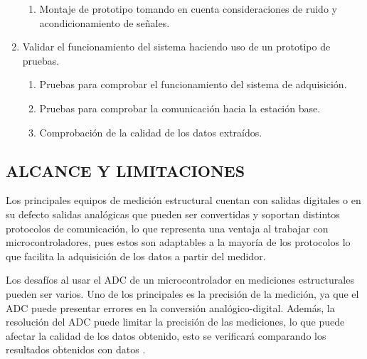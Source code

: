 \documentclass[12pt,letterpaper]{article}
\begin{document}
\begin{enumerate}[1.]
\begin{enumerate}
		      \item Montaje de prototipo tomando en cuenta consideraciones de ruido y acondicionamiento de señales.

	      \end{enumerate}

	\item Validar el funcionamiento del sistema haciendo uso de un prototipo de pruebas.


	      \begin{enumerate}

		      \item Pruebas para comprobar el funcionamiento del sistema de adquisición.
		      \item Pruebas para comprobar la comunicación hacia la estación base.
		      \item Comprobación de la calidad de los datos extraídos.

	      \end{enumerate}





\end{enumerate}




\newpage


\begin{center}

	\section*{ ALCANCE Y LIMITACIONES}
\end{center}

Los principales equipos de medición estructural cuentan con salidas digitales o en su defecto salidas analógicas que pueden ser convertidas y soportan distintos protocolos de comunicación, lo que representa una ventaja al trabajar con microcontroladores, pues estos son adaptables a la mayoría de los protocolos lo que facilita la adquisición de los datos a partir del medidor.

Los desafíos al usar el ADC de un microcontrolador en mediciones estructurales pueden ser varios. Uno de los principales es la precisión de la medición, ya que el ADC puede presentar errores en la conversión analógico-digital. Además, la resolución del ADC puede limitar la precisión de las mediciones, lo que puede afectar la calidad de los datos obtenido, esto se verificará comparando los resultados obtenidos con datos .
\end{document}
